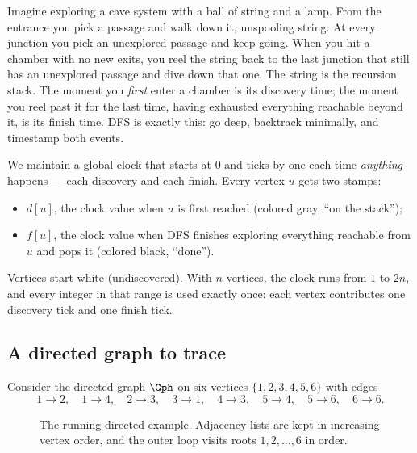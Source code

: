 \begin{intuitionbox}
Imagine exploring a cave system with a ball of string and a lamp. From the entrance you pick a passage and walk down it, unspooling string. At every junction you pick an unexplored passage and keep going. When you hit a chamber with no new exits, you reel the string back to the last junction that still has an unexplored passage and dive down that one. The string is the recursion stack. The moment you \emph{first} enter a chamber is its discovery time; the moment you reel past it for the last time, having exhausted everything reachable beyond it, is its finish time. DFS is exactly this: go deep, backtrack minimally, and timestamp both events.
\end{intuitionbox}

We maintain a global clock that starts at $0$ and ticks by one each time \emph{anything} happens --- each discovery and each finish. Every vertex $u$ gets two stamps:
\begin{itemize}
  \item $d[u]$, the clock value when $u$ is first reached (colored gray, ``on the stack'');
  \item $f[u]$, the clock value when DFS finishes exploring everything reachable from $u$ and pops it (colored black, ``done'').
\end{itemize}
Vertices start white (undiscovered). With $n$ vertices, the clock runs from $1$ to $2n$, and every integer in that range is used exactly once: each vertex contributes one discovery tick and one finish tick.

\subsection{A directed graph to trace}

Consider the directed graph $\Gph$ on six vertices $\{1,2,3,4,5,6\}$ with edges
\[
1\to2,\quad 1\to4,\quad 2\to3,\quad 3\to1,\quad 4\to3,\quad 5\to4,\quad 5\to6,\quad 6\to6.
\]

\begin{figure}[H]
\centering
{}
\caption{The running directed example. Adjacency lists are kept in increasing vertex order, and the outer loop visits roots $1,2,\dots,6$ in order.}
\label{ch03:fig-digraph}
\end{figure}

